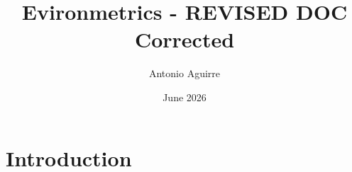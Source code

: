 \documentclass{article}
\title{Evironmetrics - REVISED DOC Corrected}
\author{Antonio Aguirre}
\date{June 2026}
\begin{document}
\maketitle

\section{Introduction}
\end{document}
